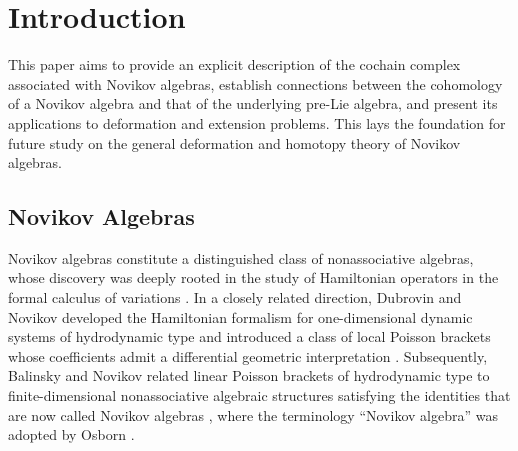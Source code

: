 \documentclass[12pt]{amsart}
\theoremstyle{definition}
\begin{document}
\tableofcontents



\allowdisplaybreaks

\section{Introduction}

This paper aims to provide an explicit description of the cochain complex associated with Novikov algebras, establish connections between the cohomology of a Novikov algebra and that of the underlying pre-Lie algebra, and present its applications to deformation and extension problems. This lays the foundation for future study on the general deformation and homotopy theory of Novikov algebras.



\subsection{Novikov Algebras}
Novikov algebras constitute a distinguished class of nonassociative algebras, whose discovery was deeply rooted in the study of Hamiltonian operators in the formal
calculus of variations \cite{GD,GD1}. In a closely related direction, Dubrovin and Novikov developed the Hamiltonian formalism for one-dimensional dynamic systems of hydrodynamic type and introduced a class of local Poisson brackets whose coefficients admit a differential geometric interpretation \cite{Du-No}. Subsequently, Balinsky and Novikov related linear Poisson brackets of hydrodynamic type to finite-dimensional nonassociative algebraic structures satisfying the identities that are now called Novikov algebras \cite{BN}, where the terminology ``Novikov algebra'' was adopted by Osborn \cite{Osborn1992,O1994}.
\end{document}
